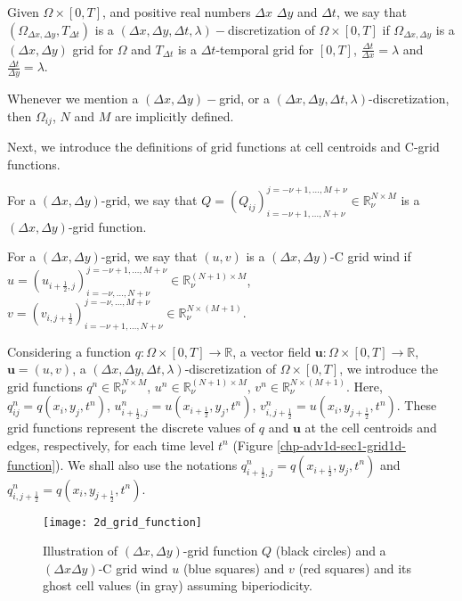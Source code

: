 \begin{definition}
	\label{chp-adv1d-def-dxdytimegrid}
	Given $\Omega \times [0,T]$,
	and positive real numbers $\Delta x$ $\Delta y$ and $\Delta t$, we say that
	$(\Omega_{\Delta x, \Delta y}, {T}_{\Delta t})$
	is a $(\Delta x,\Delta y,\Delta t, \lambda)-$discretization of $\Omega \times [0,T]$ if
	$\Omega_{\Delta x, \Delta y}$ is a $(\Delta x,\Delta y)$
	grid for $\Omega$ and ${T}_{\Delta t}$ is a $\Delta t$-temporal
	grid for $[0,T]$, $\frac{\Delta t}{\Delta x} = \lambda$
	and  $\frac{\Delta t}{\Delta y} = \lambda$.
\end{definition}
\begin{remark}
	Whenever we mention a $(\Delta x,\Delta y)-$grid, or a $(\Delta x,\Delta y,\Delta t, \lambda)$-discretization,
	then $\Omega_{ij}$, $N$ and $M$ are implicitly defined.
\end{remark}
Next, we introduce the definitions of grid functions at cell centroids and C-grid functions. 
\begin{definition}
	\label{chp-adv1d-rmk-2d-gridfunction1}
	For a $(\Delta x,\Delta y)$-grid, we say that $Q = (Q_{ij})_{i=-\nu+1,\ldots,N+\nu}^{j=-\nu+1,\ldots,M+\nu} \in \mathbb{R}^{N\times M}_{\nu}$ is a 
	$(\Delta x,\Delta y)$-grid function.
\end{definition}
\begin{definition}
	\label{chp-adv1d-rmk-2d-gridfunction2}
	For a $(\Delta x,\Delta y)$-grid, we say that $(u,v)$ is a $(\Delta x,\Delta y)$-C grid wind if 
	$u = (u_{i+\frac{1}{2},j})_{i=-\nu,\ldots,N+\nu}^{j=-\nu+1,\ldots,M+\nu} \in \mathbb{R}^{(N+1) \times M}_{\nu}$, 
    $v = (v_{i,j+\frac{1}{2}})_{i=-\nu+1,\ldots,N+\nu}^{j=-\nu,\ldots,M+\nu} \in \mathbb{R}^{N \times (M+1)}_{\nu}$.
\end{definition}
Considering a function $q:\Omega\times[0,T] \to \mathbb{R}$,
a vector field $\boldsymbol{u}:\Omega\times[0,T] \to \mathbb{R}$, $\boldsymbol{u}=(u,v)$,
a $(\Delta x,\Delta y, \Delta t, \lambda)$-discretization
of $\Omega\times[0,T]$, we introduce the grid functions $q^n \in \mathbb{R}^{N\times M}_{\nu}$,
$u^n \in \mathbb{R}^{(N+1)\times M}_{\nu}$, $v^n \in \mathbb{R}^{N\times (M+1)}_{\nu}$. 
Here, ${q}^n_{ij} = {q}(x_i, y_j,t^{n})$, $u^n_{i+\frac{1}{2},j} = u(x_{i+\frac{1}{2}},y_j, t^n)$,
$v^n_{i,j+\frac{1}{2}} = u(x_i,y_{j+\frac{1}{2}}, t^n)$.
These grid functions represent the discrete values of $q$ and $\boldsymbol{u}$
at the cell centroids and edges, respectively,
for each time level $t^n$ (Figure \ref{chp-adv1d-sec1-grid1d-function}).
We shall also use the notations $q^n_{i+\frac{1}{2},j} = q(x_{i+\frac{1}{2}},y_j, t^n)$
and $q^n_{i,j+\frac{1}{2}} = q(x_i,y_{j+\frac{1}{2}}, t^n)$.
\begin{figure}[!htb]
	\centering
	\texttt{[image: 2d\_grid\_function]}
	\caption{Illustration of $(\Delta x, \Delta y)$-grid function $Q$ (black circles)
		and a $(\Delta x\Delta y)$-C grid wind $u$ (blue squares) and $v$ (red squares) and its ghost cell
		values (in gray) assuming biperiodicity.\label{chp-adv2d-sec1-grid2d-function}}
\end{figure}

